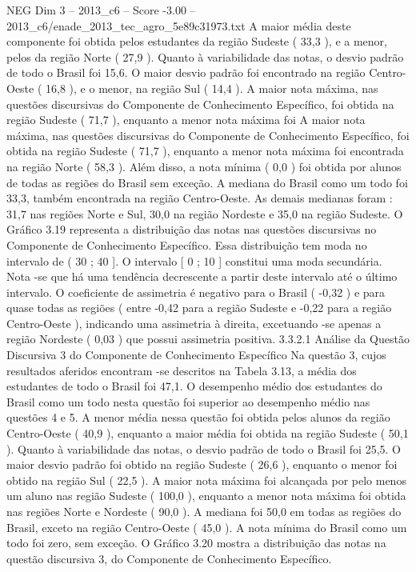 \begin{textsample}{NEG Dim 3 – 2013\_c6 – Score -3.00 – 2013\_c6/enade\_2013\_tec\_agro\_5e89c31973.txt}
A maior média deste componente foi obtida pelos estudantes da região Sudeste ( 33,3 ), e a menor, pelos da região Norte ( 27,9 ).
Quanto à variabilidade das notas, o desvio padrão de todo o Brasil foi 15,6.
O maior desvio padrão foi encontrado na região Centro-Oeste ( 16,8 ), e o menor, na região Sul ( 14,4 ).
A maior nota máxima, nas questões discursivas do Componente de Conhecimento Específico, foi obtida na região Sudeste ( 71,7 ), enquanto a menor nota máxima foi A maior nota máxima, nas questões discursivas do Componente de Conhecimento Específico, foi obtida na região Sudeste ( 71,7 ), enquanto a menor nota máxima foi encontrada na região Norte ( 58,3 ).
Além disso, a nota mínima ( 0,0 ) foi obtida por alunos de todas as regiões do Brasil sem exceção.
A mediana do Brasil como um todo foi 33,3, também encontrada na região Centro-Oeste.
As demais medianas foram : 31,7 nas regiões Norte e Sul, 30,0 na região Nordeste e 35,0 na região Sudeste.
O Gráfico 3.19 representa a distribuição das notas nas questões discursivas no Componente de Conhecimento Específico.
Essa distribuição tem moda no intervalo de ( 30 ; 40 ].
O intervalo [ 0 ; 10 ] constitui uma moda secundária.
Nota -se que há uma tendência decrescente a partir deste intervalo até o último intervalo.
O coeficiente de assimetria é negativo para o Brasil ( -0,32 ) e para quase todas as regiões ( entre -0,42 para a região Sudeste e -0,22 para a região Centro-Oeste ), indicando uma assimetria à direita, excetuando -se apenas a região Nordeste ( 0,03 ) que possui assimetria positiva. 3.3.2.1 Análise da Questão Discursiva 3 do Componente de Conhecimento Específico Na questão 3, cujos resultados aferidos encontram -se descritos na Tabela 3.13, a média dos estudantes de todo o Brasil foi 47,1.
O desempenho médio dos estudantes do Brasil como um todo nesta questão foi superior ao desempenho médio nas questões 4 e 5.
A menor média nessa questão foi obtida pelos alunos da região Centro-Oeste ( 40,9 ), enquanto a maior média foi obtida na região Sudeste ( 50,1 ).
Quanto à variabilidade das notas, o desvio padrão de todo o Brasil foi 25,5.
O maior desvio padrão foi obtido na região Sudeste ( 26,6 ), enquanto o menor foi obtido na região Sul ( 22,5 ).
A maior nota máxima foi alcançada por pelo menos um aluno nas região Sudeste ( 100,0 ), enquanto a menor nota máxima foi obtida nas regiões Norte e Nordeste ( 90,0 ).
A mediana foi 50,0 em todas as regiões do Brasil, exceto na região Centro-Oeste ( 45,0 ).
A nota mínima do Brasil como um todo foi zero, sem exceção.
O Gráfico 3.20 mostra a distribuição das notas na questão discursiva 3, do Componente de Conhecimento Específico.

\end{textsample}
